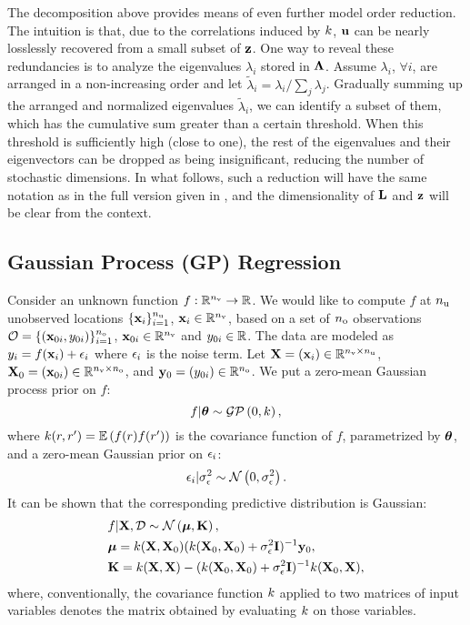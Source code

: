 The decomposition above provides means of even further model order reduction. The intuition is that, due to the correlations induced by $\fCov$, $\mathbf{u}$ can be nearly losslessly recovered from a small subset of $\mathbf{z}$. One way to reveal these redundancies is to analyze the eigenvalues $\lambda_i$ stored in $\mathbf{\Lambda}$. Assume $\lambda_i$, $\forall i$, are arranged in a non-increasing order and let $\tilde{\lambda}_i = \lambda_i / \sum_j \lambda_j$. Gradually summing up the arranged and normalized eigenvalues $\tilde{\lambda}_i$, we can identify a subset of them, which has the cumulative sum greater than a certain threshold. When this threshold is sufficiently high (close to one), the rest of the eigenvalues and their eigenvectors can be dropped as being insignificant, reducing the number of stochastic dimensions. In what follows, such a reduction will have the same notation as in the full version given in , and the dimensionality of $\mathbf{L}$ and $\mathbf{z}$ will be clear from the context.

\subsection{Gaussian Process (GP) Regression} 
Consider an unknown function $f: \mathbb{R}^{n_\text{v}} \to \mathbb{R}$. We would like to compute $f$ at ${n_\text{u}}$ unobserved locations $\{ \mathbf{x}_i \}_{i = 1}^{n_\text{u}}$, $\mathbf{x}_i \in \mathbb{R}^{n_\text{v}}$, based on a set of ${n_\text{o}}$ observations $\mathcal{O} = \{ (\mathbf{x}_{0i}, y_{0i}) \}_{i = 1}^{n_\text{o}}$, $\mathbf{x}_{0i} \in \mathbb{R}^{n_\text{v}}$ and $y_{0i} \in \mathbb{R}$. The data are modeled as $y_i = f(\mathbf{x}_i) + \epsilon_i$ where $\epsilon_i$ is the noise term. Let $\mathbf{X} = (\mathbf{x}_i) \in \mathbb{R}^{{n_\text{v}} \times {n_\text{u}}}$, $\mathbf{X}_0 = (\mathbf{x}_{0i}) \in \mathbb{R}^{{n_\text{v}} \times {n_\text{o}}}$, and $\mathbf{y}_0 = (y_{0i}) \in \mathbb{R}^{n_\text{o}}$. We put a zero-mean Gaussian process prior on $f$:
\[
  f | \vparam \sim \gaussianp{0}{\fCov},
\]
where $\fCov{\r, \r'} = \E{f(\r) f(\r')}$ is the covariance function of $f$, parametrized by ${\boldsymbol\theta}$, and a zero-mean Gaussian prior on $\epsilon_i$:
\[
  \epsilon_i | \sigma^2_\epsilon \sim \mathcal{N}\left( 0, \sigma^2_\epsilon \right).
\]
It can be shown \cite{mackay2003, rasmussen2006} that the corresponding predictive distribution is Gaussian:
\begin{align*}
  & f | \m{X}, \Data \sim \gaussian{\vmean}{\mCov}, \\
  & \vmean = \fCov{\m{X}, \m{X}_0} (\fCov{\m{X}_0, \m{X}_0} + \sigma^2_\noise \mI)^{-1} \v{y}_0, \\
  & \mCov = \fCov{\m{X}, \m{X}} - (\fCov{\m{X}_0, \m{X}_0} + \sigma^2_\noise \mI)^{-1} \fCov{\m{X}_0, \m{X}},
\end{align*}
where, conventionally, the covariance function $\fCov$ applied to two matrices of input variables denotes the matrix obtained by evaluating $\fCov$ on those variables.
